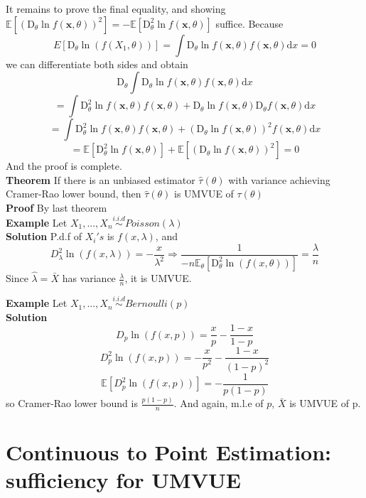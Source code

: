 \documentclass[a4paper,12pt]{article}
\begin{document}
It remains to prove the final equality, and showing $\mathbb{E}[(\mathrm{D}_{\theta} \ln f(\textbf{x}, \theta))^2] = - \mathbb{E}[ \mathrm{D}^2_\theta \ln f(\textbf{x}, \theta) ]$ suffice. Because
$$E[\mathrm{D}_\theta \ln(f(X_1, \theta))] = \int \mathrm{D}_\theta \ln f(\textbf{x}, \theta) f(\textbf{x}, \theta) \mathrm{d}x= 0$$
we can differentiate both sides and obtain
$$\mathrm{D}_\theta \int \mathrm{D}_\theta \ln f(\textbf{x}, \theta) f(\textbf{x}, \theta) \mathrm{d}x$$
$$= \int \mathrm{D}^2_\theta \ln f(\textbf{x}, \theta) f(\textbf{x}, \theta) + \mathrm{D}_\theta \ln f(\textbf{x}, \theta) \mathrm{D}_\theta f(\textbf{x}, \theta) \mathrm{d}x$$
$$= \int \mathrm{D}^2_\theta \ln f(\textbf{x}, \theta) f(\textbf{x}, \theta) + (\mathrm{D}_\theta \ln f(\textbf{x}, \theta))^2 f(\textbf{x}, \theta) \mathrm{d}x$$
$$= \mathbb{E}[ \mathrm{D}^2_\theta \ln f(\textbf{x}, \theta) ] + \mathbb{E}[(\mathrm{D}_{\theta} \ln f(\textbf{x}, \theta))^2] = 0$$
And the proof is complete.\\

\textbf{Theorem} If there is an unbiased estimator $\hat{\tau}(\theta)$ with variance achieving Cramer-Rao lower bound, then $\hat{\tau}(\theta)$ is UMVUE of $\tau(\theta)$\\

\textbf{Proof} By last theorem\\

\textbf{Example} Let $X_1, ..., X_n \overset{i.i.d}{\sim} Poisson(\lambda)$\\

\textbf{Solution} P.d.f of $X_i's$ is $f(x, \lambda)$, and
$$D_\lambda^2 \ln(f(x, \lambda)) = -\frac{x}{\lambda^2} \Rightarrow \frac{1}{-n\mathbb{E}_\theta
[\mathrm{D}_\theta^2 \ln(f(x, \theta))]} = \frac{\lambda}{n}$$
Since $\hat{\lambda} = \bar{X}$ has variance $\frac{\lambda}{n}$, it is UMVUE.

\textbf{Example} Let $X_1, ..., X_n \overset{i.i.d}{\sim} Bernoulli(p)$\\

\textbf{Solution} 
$$D_p \ln(f(x, p)) = \frac{x}{p} - \frac{1-x}{1-p}$$
$$D_p^2 \ln(f(x, p)) = -\frac{x}{p^2} - \frac{1-x}{(1-p)^2}$$
$$\mathbb{E}[ D_p^2 \ln(f(x, p)) ] = -\frac{1}{p(1-p)}$$
so Cramer-Rao lower bound is $\frac{p(1-p)}{n}$. And again, m.l.e of $p$, $\bar{X}$ is UMVUE of p.

\newpage
\section{Continuous to Point Estimation: sufficiency for UMVUE}
\end{document}
